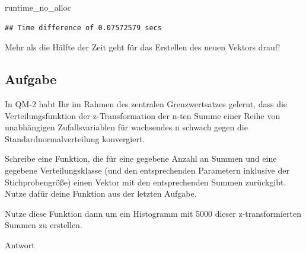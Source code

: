 \documentclass[
]{book}
\newenvironment{Shaded}{\begin{snugshade}}{\end{snugshade}}
\newcommand{\NormalTok}[1]{#1}
\begin{document}
\begin{Shaded}
\begin{Highlighting}[]
\NormalTok{runtime\_no\_alloc}
\end{Highlighting}
\end{Shaded}

\begin{verbatim}
## Time difference of 0.07572579 secs
\end{verbatim}

Mehr als die Hälfte der Zeit geht für das Erstellen des neuen Vektors drauf!

\hypertarget{aufgabe-4}{%
\subsection{Aufgabe}\label{aufgabe-4}}

In QM-2 habt Ihr im Rahmen des zentralen Grenzwertsatzes gelernt, dass die Verteilungsfunktion der z-Transformation der n-ten Summe einer Reihe von unabhängigen Zufallsvariablen für wachsendes n schwach gegen die Standardnormalverteilung konvergiert.

Schreibe eine Funktion, die für eine gegebene Anzahl an Summen und eine gegebene Verteilungsklasse (und den entsprechenden Parametern inklusive der Stichprobengröße) einen Vektor mit den entsprechenden Summen zurückgibt.
Nutze dafür deine Funktion aus der letzten Aufgabe.

Nutze diese Funktion dann um ein Histogramm mit 5000 dieser z-transformierten Summen zu erstellen.

Antwort
\end{document}
